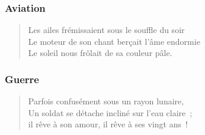 \documentclass[12pt]{article}
\begin{document}
{\selectfont 

  \subsubsection*{Aviation}

  \begin{verse}
    Les ailes frémissaient sous le souffle du soir \\
	  Le moteur de son chant berçait l'âme endormie \\
	  Le soleil nous frôlait de sa couleur pâle.
  \end{verse}
  
  \subsubsection*{Guerre}
  
  \begin{verse}
	  Parfois confusément sous un rayon lunaire,\\
	  Un soldat se détache incliné sur l'eau claire ; \\
	  il rêve à son amour, il rêve à ses vingt ans !
  \end{verse}
}
\end{document}
